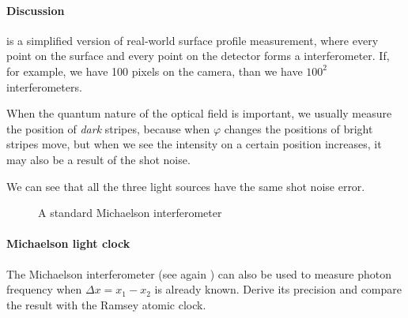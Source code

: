 \documentclass[hyperref, a4paper]{article}
\begin{document}
\paragraph{Discussion}  is a simplified version of real-world surface profile measurement, 
where every point on the surface and every point on the detector forms a interferometer.
If, for example, we have 100 pixels on the camera, than we have $100^2$ interferometers.

When the quantum nature of the optical field is important, we usually measure the position of \emph{dark} 
stripes, because when $\varphi$ changes the positions of bright stripes move, but when we see the intensity 
on a certain position increases, it may also be a result of the shot noise. 

We can see that all the three light sources have the same shot noise error. 

\begin{figure}
    \centering
    
    \caption{A standard Michaelson interferometer}
    \label{fig:michaelson}
\end{figure}

\paragraph{}

\paragraph{Michaelson light clock} The Michaelson interferometer (see again ) can also be used
to measure photon frequency when $\Delta x = x_1 - x_2$ is already known. Derive its precision and compare the result with 
the Ramsey atomic clock.
\end{document}
